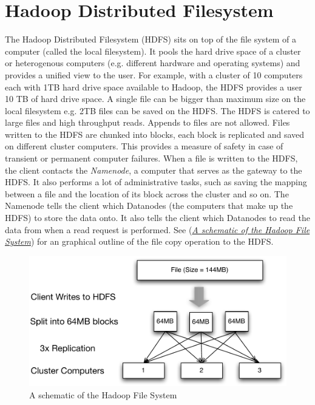 \documentclass[letterpaper,10pt,english]{sphinxmanual}
\begin{document}
\section{Hadoop Distributed Filesystem}
\label{introduction:hadoop-distributed-filesystem}
The Hadoop Distributed Filesystem (HDFS) sits on top of the file system of a
computer (called the local filesystem). It pools the hard drive space of a
cluster or heterogenous computers (e.g. different hardware and operating
systems) and provides a unified view to the user. For example, with a cluster of
10 computers each with 1TB hard drive space available to Hadoop, the HDFS
provides a user 10 TB of hard drive space. A single file can be bigger than
maximum size on the local filesystem e.g. 2TB files can be saved on the
HDFS. The HDFS is catered to large files and high throughput reads. Appends to
files are not allowed. Files written to the HDFS are chunked into blocks, each
block is replicated and saved on different cluster computers. This provides a
measure of safety in case of transient or permanent computer failures.  When a
file is written to the HDFS, the client contacts the \emph{Namenode}, a computer that
serves as the gateway to the HDFS. It also performs a lot of administrative
tasks, such as saving the mapping between a file and the location of its block
across the cluster and so on. The Namenode tells the client which Datanodes (the
computers that make up the HDFS) to store the data onto. It also tells the
client which Datanodes to read the data from when a read request is
performed. See (\hyperref[introduction:hadoopschematic]{\emph{A schematic of the Hadoop File System}}) for an graphical outline of the file
copy operation to the HDFS.
\label{introduction:hadoopschematic}\begin{figure}[htbp]
\centering

\includegraphics{hdfs-write.pdf}
\caption{A schematic of the Hadoop File System}\end{figure}
\end{document}
